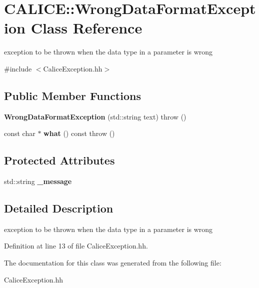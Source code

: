 \section{CALICE::WrongDataFormatException Class Reference}
\label{classCALICE_1_1WrongDataFormatException}


exception to be thrown when the data type in a parameter is wrong  


{\ttfamily \#include $<$CaliceException.hh$>$}\subsection*{Public Member Functions}
\begin{DoxyCompactItemize}
\item 
{\bfseries WrongDataFormatException} (std::string text)  throw ()\label{classCALICE_1_1WrongDataFormatException_a969132915151f6d413bb410a33ad350b}

\item 
const char $\ast$ {\bfseries what} () const   throw ()\label{classCALICE_1_1WrongDataFormatException_a5a7c6e2b27deef9c9afecfbcc532db28}

\end{DoxyCompactItemize}
\subsection*{Protected Attributes}
\begin{DoxyCompactItemize}
\item 
std::string {\bfseries \_\-message}\label{classCALICE_1_1WrongDataFormatException_afe8c376d76c4d8e987dc5f94736eaacf}

\end{DoxyCompactItemize}


\subsection{Detailed Description}
exception to be thrown when the data type in a parameter is wrong 

Definition at line 13 of file CaliceException.hh.

The documentation for this class was generated from the following file:\begin{DoxyCompactItemize}
\item 
CaliceException.hh\end{DoxyCompactItemize}
